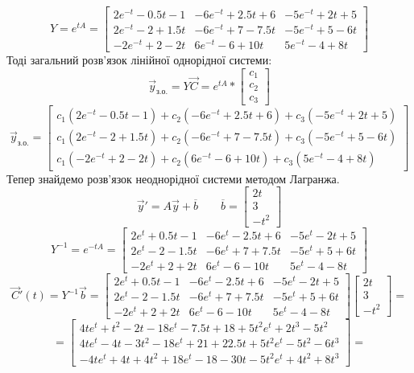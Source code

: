 \documentclass[14pt,a4paper]{scrartcl}
\theoremstyle{definition}
\theoremstyle{remark}
\theoremstyle{definition}
\theoremstyle{definition}
\begin{document}
$$
Y = e^{tA} = \begin{bmatrix}
 2e^{-t} -0.5t - 1  & -6 e^{-t} + 2.5t + 6  & -5 e^{-t} +2t +5 \\
 2 e^{-t} -2 + 1.5t & -6 e^{-t} +7 -7.5t   &-5 e^{-t} +5 -6t \\
 -2 e^{-t} +2 -2t   & 6 e^{-t} -6 +10t       &  5 e^{-t} -4 + 8 t
\end{bmatrix}
$$
Тоді загальний розв'язок лінійної однорідної системи:
$$
\vec{y}_{\text{з.о.}} = Y\vec{C} = e^{tA} * \begin{bmatrix}
 c_1 \\ c_2 \\ c_3
\end{bmatrix}
$$
$$
\vec{y}_{\text{з.о.}} = \begin{bmatrix}
c_1( 2e^{-t} -0.5t - 1 ) + c_2 (-6 e^{-t} + 2.5t + 6 ) +c_3 ( -5 e^{-t} +2t +5) \\
 c_1(2 e^{-t} -2 + 1.5t) + c_2 (-6 e^{-t} +7 -7.5t)   +c_3 (-5 e^{-t} +5 -6t) \\
 c_1(-2 e^{-t} +2 -2t  ) + c_2 (6 e^{-t} -6 +10t)       +c_3 ( 5 e^{-t} -4 + 8 t)
\end{bmatrix}
$$
Тепер знайдемо розв'язок неоднорідної системи методом Лагранжа.
$$
\vec{y}' = A\vec{y} + \overline{b} \qquad \overline{b} = \begin{bmatrix}
  2t\\
	3\\
	-t^2
\end{bmatrix}
$$
$$
Y^{-1 } = e^{-tA}= \begin{bmatrix}
 2e^{t} +0.5t - 1  & -6 e^{t} - 2.5t + 6  & -5 e^{t} -2t +5 \\
 2 e^{t} -2 - 1.5t & -6 e^{t} +7 +7.5t   &-5 e^{t} +5 +6t \\
 -2 e^{t} +2 +2t   & 6 e^{t} -6 -10t       &  5 e^{t} -4 - 8 t
\end{bmatrix}
$$
$$
\vec{C}'(t) = Y^{-1} \vec{b} = \begin{bmatrix}
 2e^{t} +0.5t - 1  & -6 e^{t} - 2.5t + 6  & -5 e^{t} -2t +5 \\
 2 e^{t} -2 - 1.5t & -6 e^{t} +7 +7.5t   &-5 e^{t} +5 +6t \\
 -2 e^{t} +2 +2t   & 6 e^{t} -6 -10t       &  5 e^{t} -4 - 8 t
\end{bmatrix} \begin{bmatrix}
  2t\\
	3\\
	-t^2
\end{bmatrix}=
$$
$$
= \begin{bmatrix}
 4te^{t} + t^2 - 2t  -18 e^{t} - 7.5t + 18 + 5t^2 e^{t} +2t^3 -5t^2 \\
 4te^{t} -4t - 3t^2 -18 e^{t} +21 +22.5t   +5t^2 e^{t} -5t^2 -6t^3 \\
 -4t e^{t} +4t +4t^2  + 18 e^{t} -18 -30t    -5t^2 e^{t} +4t^2 + 8 t^3
\end{bmatrix}=
$$
\end{document}
